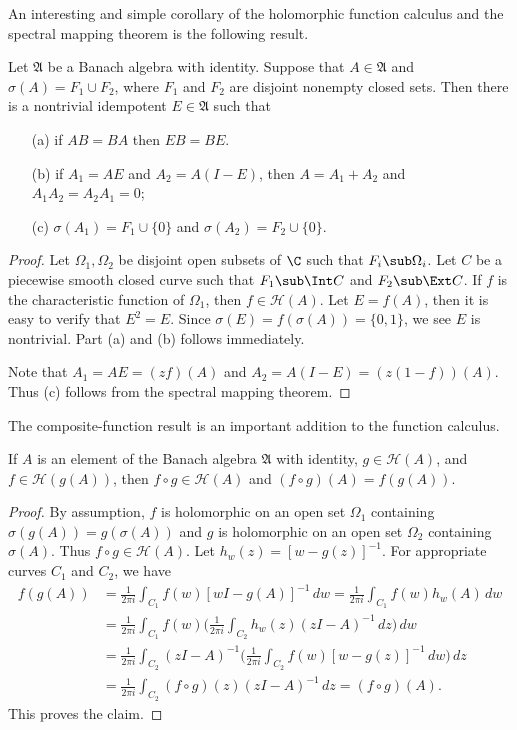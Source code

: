 An interesting and simple corollary of the holomorphic function calculus and the spectral mapping theorem is the following result.
\begin{proposition}\label{Banach algebra nonconnected spectrum}
Let $\mathfrak{A}$ be a Banach algebra with identity. Suppose that $A\in\mathfrak{A}$ and $\sigma(A)=F_1\cup F_2$, where $F_1$ and $F_2$ are disjoint nonempty closed sets. Then there is a nontrivial idempotent $E\in\mathfrak{A}$ such that
\begin{itemize}
\item[(a)] if $AB=BA$ then $EB=BE$.
\item[(b)] if $A_1=AE$ and $A_2=A(I-E)$, then $A=A_1+A_2$ and $A_1A_2=A_2A_1=0$;
\item[(c)] $\sigma(A_1)=F_1\cup\{0\}$ and $\sigma(A_2)=F_2\cup\{0\}$.
\end{itemize}
\end{proposition}
\begin{proof}
Let $\Omega_1,\Omega_2$ be disjoint open subsets of $\C$ such that $F_i\sub\Omega_i$. Let $C$ be a piecewise smooth closed curve such that $F_1\sub\Int C$ and $F_2\sub\Ext C$. If $f$ is the characteristic function of $\Omega_1$, then $f\in\mathcal{H}(A)$. Let $E=f(A)$, then it is easy to verify that $E^2=E$. Since $\sigma(E)=f(\sigma(A))=\{0,1\}$, we see $E$ is nontrivial. Part (a) and (b) follows immediately.\par
Note that $A_1=AE=(zf)(A)$ and $A_2=A(I-E)=(z(1-f))(A)$. Thus (c) follows from the spectral mapping theorem.
\end{proof}
The composite-function result is an important addition to the function calculus.
\begin{proposition}\label{Banach algebra function calculus composition}
If $A$ is an element of the Banach algebra $\mathfrak{A}$ with identity, $g\in\mathcal{H}(A)$, and $f\in\mathcal{H}(g(A))$, then $f\circ g\in\mathcal{H}(A)$ and $(f\circ g)(A)=f(g(A))$.
\end{proposition}
\begin{proof}
By assumption, $f$ is holomorphic on an open set $\Omega_1$ containing $\sigma(g(A))=g(\sigma(A))$ and $g$ is holomorphic on an open set $\Omega_2$ containing $\sigma(A)$. Thus $f\circ g\in\mathcal{H}(A)$. Let $h_w(z)=[w-g(z)]^{-1}$. For appropriate curves $C_1$ and $C_2$, we have
\begin{align*}
f(g(A))&=\frac{1}{2\pi i}\int_{C_1}f(w)[wI-g(A)]^{-1}\,dw=\frac{1}{2\pi i}\int_{C_1}f(w)h_w(A)\,dw\\
&=\frac{1}{2\pi i}\int_{C_1}f(w)\Big(\frac{1}{2\pi i}\int_{C_2}h_w(z)(zI-A)^{-1}\,dz\Big)\,dw\\
&=\frac{1}{2\pi i}\int_{C_2}(zI-A)^{-1}\Big(\frac{1}{2\pi i}\int_{C_2}f(w)[w-g(z)]^{-1}\,dw\Big)\,dz\\
&=\frac{1}{2\pi i}\int_{C_2}(f\circ g)(z)(zI-A)^{-1}\,dz=(f\circ g)(A).
\end{align*}
This proves the claim.
\end{proof}

